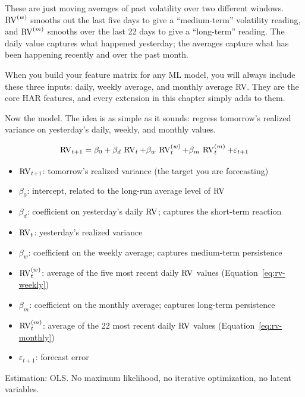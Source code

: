 \begin{intuition}
These are just moving averages of past volatility over two different windows.
$\operatorname{RV}^{(w)}$ smooths out the last five days to give a ``medium-term'' volatility reading, and $\operatorname{RV}^{(m)}$ smooths over the last 22 days to give a ``long-term'' reading.
The daily value captures what happened yesterday; the averages capture what has been happening recently and over the past month.
\end{intuition}

\begin{projectconnection}
When you build your feature matrix for any ML model, you will always include these three inputs: daily, weekly average, and monthly average RV.
They are the core HAR features, and every extension in this chapter simply adds to them.
\end{projectconnection}

Now the model.
The idea is as simple as it sounds: regress tomorrow's realized variance on yesterday's daily, weekly, and monthly values.

\begin{definition}
\label{def:har}
\begin{equation}
  \operatorname{RV}_{t+1} = \beta_0 + \beta_d \, \operatorname{RV}_{t} + \beta_w \, \operatorname{RV}^{(w)}_{t} + \beta_m \, \operatorname{RV}^{(m)}_{t} + \varepsilon_{t+1}
  \label{eq:har}
\end{equation}
\begin{itemize}[nosep]
  \item $\operatorname{RV}_{t+1}$: tomorrow's realized variance (the target you are forecasting)
  \item $\beta_0$: intercept, related to the long-run average level of $\operatorname{RV}$
  \item $\beta_d$: coefficient on yesterday's daily $\operatorname{RV}$; captures the short-term reaction
  \item $\operatorname{RV}_t$: yesterday's realized variance
  \item $\beta_w$: coefficient on the weekly average; captures medium-term persistence
  \item $\operatorname{RV}^{(w)}_{t}$: average of the five most recent daily $\operatorname{RV}$ values (Equation~\ref{eq:rv-weekly})
  \item $\beta_m$: coefficient on the monthly average; captures long-term persistence
  \item $\operatorname{RV}^{(m)}_{t}$: average of the 22 most recent daily $\operatorname{RV}$ values (Equation~\ref{eq:rv-monthly})
  \item $\varepsilon_{t+1}$: forecast error
\end{itemize}
Estimation: OLS.
No maximum likelihood, no iterative optimization, no latent variables.
\end{definition}

